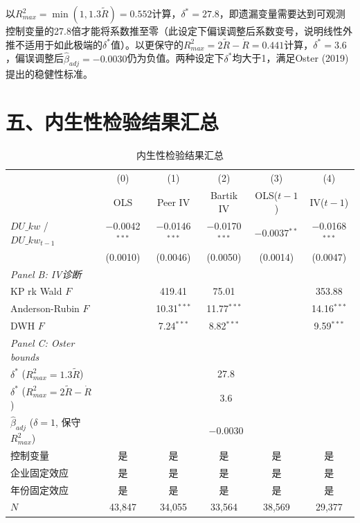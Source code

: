 \documentclass[11pt,a4paper]{article}
\begin{document}
以$R^2_{max}=\min(1, 1.3\tilde{R})=0.552$计算，$\delta^*=27.8$，即遗漏变量需要达到可观测控制变量的27.8倍才能将系数推至零（此设定下偏误调整后系数变号，说明线性外推不适用于如此极端的$\delta^*$值）。以更保守的$R^2_{max}=2\tilde{R}-\dot{R}=0.441$计算，$\delta^*=3.6$，偏误调整后$\hat{\beta}_{adj}=-0.0030$仍为负值。两种设定下$\delta^*$均大于1，满足Oster (2019) 提出的稳健性标准。

\section*{五、内生性检验结果汇总}

\begin{table}[htbp]
\centering
\caption{内生性检验结果汇总}
\label{tab:iv}
\vspace{6pt}
\begin{tabular}{lccccc}
\toprule
& (0) & (1) & (2) & (3) & (4) \\
& OLS & Peer IV & Bartik IV & OLS($t{-}1$) & IV($t{-}1$) \\
\midrule
$DU\_kw$ / $DU\_kw_{t-1}$ & $-$0.0042$^{***}$ & $-$0.0146$^{***}$ & $-$0.0170$^{***}$ & $-$0.0037$^{**}$ & $-$0.0168$^{***}$ \\
& (0.0010) & (0.0046) & (0.0050) & (0.0014) & (0.0047) \\[6pt]
\textit{Panel B: IV诊断} \\[3pt]
KP rk Wald $F$ & & 419.41 & 75.01 & & 353.88 \\
Anderson-Rubin $F$ & & 10.31$^{***}$ & 11.77$^{***}$ & & 14.16$^{***}$ \\
DWH $F$ & & 7.24$^{***}$ & 8.82$^{***}$ & & 9.59$^{***}$ \\[3pt]
\textit{Panel C: Oster bounds} \\[3pt]
$\delta^*$ ($R^2_{max}=1.3\tilde{R}$) & \multicolumn{5}{c}{27.8} \\
$\delta^*$ ($R^2_{max}=2\tilde{R}-\dot{R}$) & \multicolumn{5}{c}{3.6} \\
$\hat{\beta}_{adj}$ ($\delta=1$, 保守$R^2_{max}$) & \multicolumn{5}{c}{$-$0.0030} \\[3pt]
\midrule
控制变量 & 是 & 是 & 是 & 是 & 是 \\
企业固定效应 & 是 & 是 & 是 & 是 & 是 \\
年份固定效应 & 是 & 是 & 是 & 是 & 是 \\
$N$ & 43,847 & 34,055 & 33,564 & 38,569 & 29,377 \\
\bottomrule
\end{tabular}


\end{table}
\end{document}
